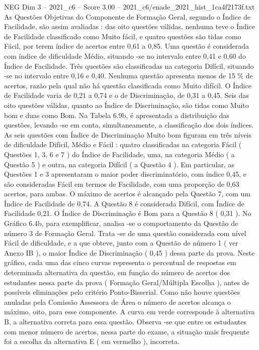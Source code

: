 \begin{textsample}{NEG Dim 3 – 2021\_c6 – Score 3.00 – 2021\_c6/enade\_2021\_hist\_1ca4f2173f.txt}
As Questões Objetivas do Componente de Formação Geral, segundo o Índice de Facilidade, são assim avaliadas : das oito questões válidas, nenhuma teve o Índice de Facilidade classificado como Muito fácil, e quatro questões são tidas como Fácil, por terem índice de acertos entre 0,61 a 0,85.
Uma questão é considerada com índice de dificuldade Médio, situando -se no intervalo entre 0,41 e 0,60 do Índice de Facilidade.
Três questões são classificadas na categoria Difícil, situando -se no intervalo entre 0,16 e 0,40.
Nenhuma questão apresenta menos de 15 \% de acertos, razão pela qual não há questão classificada como Muito difícil.
O Índice de Facilidade varia de 0,21 a 0,74 e o de Discriminação, de 0,31 a 0,45.
Seis das oito questões válidas, quanto ao Índice de Discriminação, são tidas como Muito bom e duas como Bom.
Na Tabela 6.9b, é apresentada a distribuição das questões, levando -se em conta, simultaneamente, a classificação dos dois índices.
As seis questões com Índice de Discriminação Muito bom figuram em três níveis de dificuldade Difícil, Médio e Fácil : quatro classificadas na categoria Fácil ( Questões 1, 3, 6 e 7 ) do Índice de Facilidade, uma, na categoria Médio ( a Questão 5 ) e outra, na categoria Difícil ( a Questão 4 ).
Em particular, as Questões 1 e 3 apresentaram o maior poder discriminatório, com índice 0,45, e são consideradas Fácil em termos de Facilidade, com uma proporção de 0,63 acertos, para ambas.
O máximo de acertos é alcançado pela Questão 7, com um Índice de Facilidade de 0,74.
A Questão 8 é considerada Difícil, com Índice de Facilidade 0,21.
O Índice de Discriminação é Bom para a Questão 8 ( 0,31 ).
No Gráfico 6.4b, para exemplificar, analisa -se o comportamento da Questão de número 3 de Formação Geral.
Trata -se de uma questão considerada com nível Fácil de dificuldade, e a que obteve, junto com a Questão de número 1 ( ver Anexo IB ), o maior Índice de Discriminação ( 0,45 ) dessa parte da prova.
Neste gráfico, cada uma das cinco curvas representa o percentual de respostas em determinada alternativa da questão, em função do número de acertos dos estudantes nessa parte da prova ( Formação Geral/Múltipla Escolha ), antes de possíveis eliminações pelo critério Ponto-Bisserial.
Como não houve questões anuladas pela Comissão Assessora de Área o número de acertos alcança o máximo, oito, para esse componente.
A curva em verde corresponde à alternativa B, a alternativa correta para essa questão.
Observa -se que entre os estudantes com menor número de acertos, nessa parte do exame, a situação mais frequente foi a escolha da alternativa E ( em vermelho ), incorreta.

\end{textsample}
